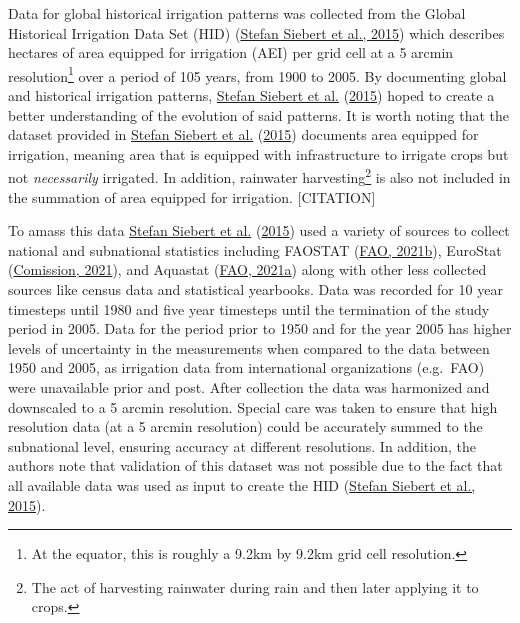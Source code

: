 \documentclass[12pt,twoside]{reedthesis}
\begin{document}
Data for global historical irrigation patterns was collected from the Global Historical Irrigation Data Set (HID) (\protect\hyperlink{ref-siebertGlobalDataSet2015}{Stefan Siebert et al., 2015}) which describes hectares of area equipped for irrigation (AEI) per grid cell at a 5 arcmin resolution\footnote{At the equator, this is roughly a 9.2km by 9.2km grid cell resolution.} over a period of 105 years, from 1900 to 2005. By documenting global and historical irrigation patterns, \protect\hyperlink{ref-siebertGlobalDataSet2015}{Stefan Siebert et al.} (\protect\hyperlink{ref-siebertGlobalDataSet2015}{2015}) hoped to create a better understanding of the evolution of said patterns. It is worth noting that the dataset provided in \protect\hyperlink{ref-siebertGlobalDataSet2015}{Stefan Siebert et al.} (\protect\hyperlink{ref-siebertGlobalDataSet2015}{2015}) documents area equipped for irrigation, meaning area that is equipped with infrastructure to irrigate crops but not \emph{necessarily} irrigated. In addition, rainwater harvesting\footnote{The act of harvesting rainwater during rain and then later applying it to crops.} is also not included in the summation of area equipped for irrigation. {[}CITATION{]}

To amass this data \protect\hyperlink{ref-siebertGlobalDataSet2015}{Stefan Siebert et al.} (\protect\hyperlink{ref-siebertGlobalDataSet2015}{2015}) used a variety of sources to collect national and subnational statistics including FAOSTAT (\protect\hyperlink{ref-faoFAOSTAT2021}{FAO, 2021b}), EuroStat (\protect\hyperlink{ref-europeancomissionEurostatDatabase2021}{Comission, 2021}), and Aquastat (\protect\hyperlink{ref-faoAQUASTAT2021}{FAO, 2021a}) along with other less collected sources like census data and statistical yearbooks. Data was recorded for 10 year timesteps until 1980 and five year timesteps until the termination of the study period in 2005. Data for the period prior to 1950 and for the year 2005 has higher levels of uncertainty in the measurements when compared to the data between 1950 and 2005, as irrigation data from international organizations (e.g.~FAO) were unavailable prior and post. After collection the data was harmonized and downscaled to a 5 arcmin resolution. Special care was taken to ensure that high resolution data (at a 5 arcmin resolution) could be accurately summed to the subnational level, ensuring accuracy at different resolutions. In addition, the authors note that validation of this dataset was not possible due to the fact that all available data was used as input to create the HID (\protect\hyperlink{ref-siebertGlobalDataSet2015}{Stefan Siebert et al., 2015}).
\end{document}
